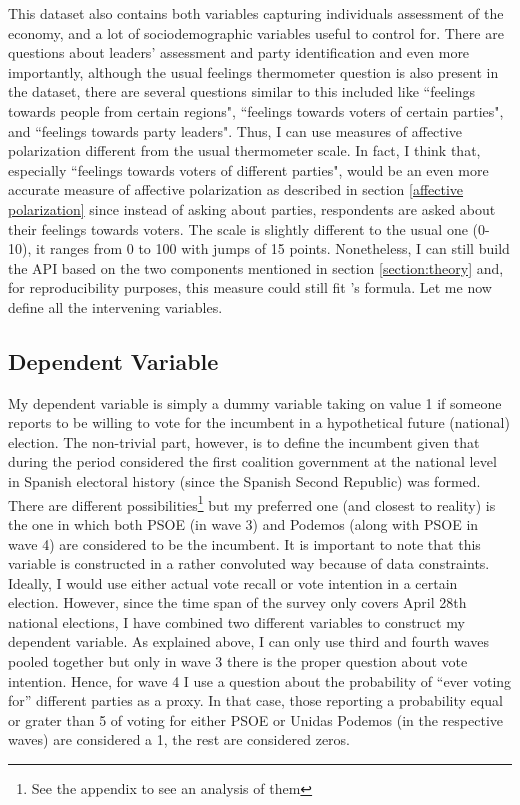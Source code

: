 \documentclass[a4paper, svgnames]{article}
\begin{document}
This dataset also contains both variables capturing individuals assessment of the economy, and a lot of sociodemographic variables useful to control for. There are questions about leaders' assessment and party identification and even more importantly, although the usual feelings thermometer question is also present in the dataset, there are several questions similar to this included like ``feelings towards people from certain regions", ``feelings towards voters of certain parties", and ``feelings towards party leaders". Thus, I can use measures of affective polarization different from the usual thermometer scale. In fact, I think that, especially ``feelings towards voters of different parties", would be an even more accurate measure of affective polarization as described in section \ref{affective polarization} since instead of asking about parties, respondents are asked about their feelings towards voters. The scale is slightly different to the usual one (0-10), it ranges from 0 to 100 with jumps of 15 points. Nonetheless, I can still build the API based on the two components mentioned in section \ref{section:theory} and, for reproducibility purposes, this measure could still fit \cite{Wagner2021}'s formula. Let me now define all the intervening variables.

\subsection{Dependent Variable}

My dependent variable is simply a dummy variable taking on value 1 if someone reports to be willing to vote for the incumbent in a hypothetical future (national) election. The non-trivial part, however, is to define the incumbent given that during the period considered the first coalition government at the national level in Spanish electoral history (since the Spanish Second Republic) was formed. There are different possibilities\footnote{See the appendix to see an analysis of them} but my preferred one (and closest to reality) is the one in which both PSOE (in wave 3) and Podemos (along with PSOE in wave 4) are considered to be the incumbent. It is important to note that this variable is constructed in a rather convoluted way because of data constraints. Ideally, I would use either actual vote recall or vote intention in a certain election. However, since the time span of the survey only covers April 28th national elections, I have combined two different variables to construct my dependent variable. As explained above, I can only use third and fourth waves pooled together but only in wave 3 there is the proper question about vote intention. Hence, for wave 4 I use a question about the probability of ``ever voting for'' different parties as a proxy. In that case, those reporting a probability equal or grater than 5 of voting for either PSOE or Unidas Podemos (in the respective waves) are considered a 1, the rest are considered zeros.
\end{document}
